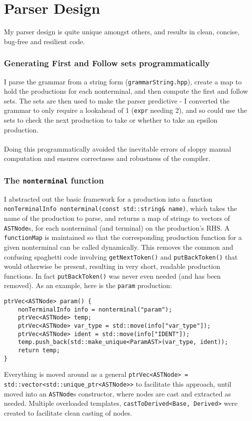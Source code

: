 \documentclass[10pt,a4paper]{article}
\newcommand{\code}[1]{\lstinline!#1!}
\begin{document}
\section*{Parser Design}
My parser design is quite unique amongst others, and results in clean, concise, bug-free and resilient code. 
\subsubsection*{Generating First and Follow sets programmatically}
I parse the grammar from a string form (\code{grammarString.hpp}), create a map to hold the productions for each nonterminal, and then compute the first and follow sets. The sets are then used to make the parser predictive - I converted the grammar to only require a lookahead of 1 (\code{expr} needing 2), and so could use the sets to check the next production to take or whether to take an epsilon production.\\\\
Doing this programmatically avoided the inevitable errors of sloppy manual computation and ensures correctness and robustness of the compiler.
\subsubsection*{The \code{nonterminal} function}
I abstracted out the basic framework for a production into a function \code{nonTerminalInfo nonterminal(const std::string& name)}, which takes the name of the production to parse, and returns a map of strings to vectors of \code{ASTNode}s, for each nonterminal (and terminal) on the production's RHS. A \code{functionMap} is maintained so that the corresponding production function for a given nonterminal can be called dynamically. This removes the common and confusing spaghetti code involving \code{getNextToken()} and \code{putBackToken()} that would otherwise be present, resulting in very short, readable production functions. In fact \code{putBackToken()} was never even needed (and has been removed). As an example, here is the \code{param} production:
\begin{lstlisting}[]
ptrVec<ASTNode> param() {
    nonTerminalInfo info = nonterminal("param");
    ptrVec<ASTNode> temp;
    ptrVec<ASTNode> var_type = std::move(info["var_type"]);
    ptrVec<ASTNode> ident = std::move(info["IDENT"]);
    temp.push_back(std::make_unique<ParamAST>(var_type, ident));
    return temp;
}
\end{lstlisting}
Everything is moved around as a general \code{ptrVec<ASTNode> = std::vector<std::unique_ptr<ASTNode>>} to facilitate this approach, until moved into an \code{ASTNode}s constructor, where nodes are cast and extracted as needed. Multiple overloaded templates, \code{castToDerived<Base, Derived>} were created to facilitate clean casting of nodes.
\end{document}
